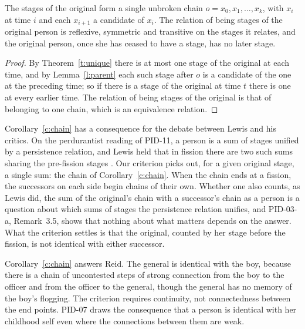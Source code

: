 \documentclass{situationist-preprint}
\begin{document}
\begin{corollary}\label{c:chain}
The stages of the original form a single unbroken chain $o = x_0, x_1, \dots, x_k$, with $x_i$ at time $i$ and each $x_{i+1}$ a candidate of $x_i$. The relation of being stages of the original person is reflexive, symmetric and transitive on the stages it relates, and the original person, once she has ceased to have a stage, has no later stage.
\end{corollary}

\begin{proof}
By Theorem~\ref{t:unique} there is at most one stage of the original at each time, and by Lemma~\ref{l:parent} each such stage after $o$ is a candidate of the one at the preceding time; so if there is a stage of the original at time $t$ there is one at every earlier time. The relation of being stages of the original is that of belonging to one chain, which is an equivalence relation.
\end{proof}

Corollary~\ref{c:chain} has a consequence for the debate between Lewis and his critics. On the perdurantist reading of PID-11, a person is a sum of stages unified by a persistence relation, and Lewis held that in fission there are two such sums sharing the pre-fission stages \citep{Lewis1976}. Our criterion picks out, for a given original stage, a single sum: the chain of Corollary~\ref{c:chain}. When the chain ends at a fission, the successors on each side begin chains of their own. Whether one also counts, as Lewis did, the sum of the original's chain with a successor's chain as a person is a question about which sums of stages the persistence relation unifies, and PID-03-a, Remark~3.5, shows that nothing about what matters depends on the answer. What the criterion settles is that the original, counted by her stage before the fission, is not identical with either successor.

\begin{remark}\label{r:reid}
Corollary~\ref{c:chain} answers Reid. The general is identical with the boy, because there is a chain of uncontested steps of strong connection from the boy to the officer and from the officer to the general, though the general has no memory of the boy's flogging. The criterion requires continuity, not connectedness between the end points. PID-07 draws the consequence that a person is identical with her childhood self even where the connections between them are weak.
\end{remark}
\end{document}
